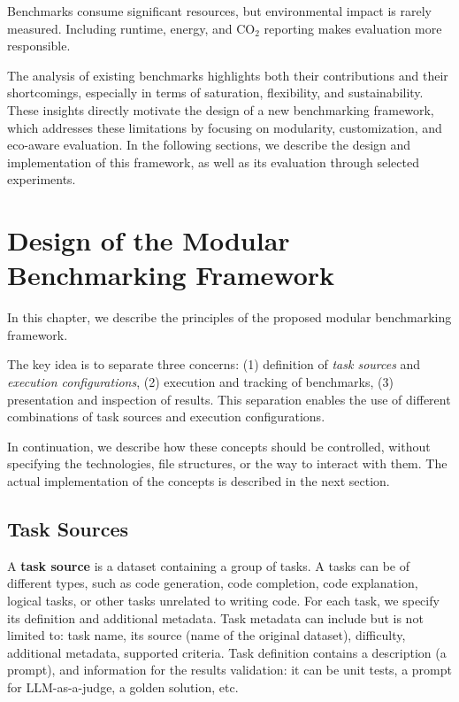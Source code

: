 Benchmarks consume significant resources, but environmental impact is rarely measured. Including runtime, energy, and CO$_2$ reporting makes evaluation more responsible.


The analysis of existing benchmarks highlights both their contributions and their shortcomings, especially in terms of saturation, flexibility, and sustainability.
These insights directly motivate the design of a new benchmarking framework, which addresses these limitations by focusing on modularity, customization, and eco-aware evaluation.
In the following sections, we describe the design and implementation of this framework, as well as its evaluation through selected experiments.


\section{Design of the Modular Benchmarking Framework}

In this chapter, we describe the principles of the proposed modular benchmarking framework.

The key idea is to separate three concerns:
(1) definition of \textit{task sources} and \textit{execution configurations},
(2) execution and tracking of benchmarks,
(3) presentation and inspection of results.
This separation enables the use of different combinations of task sources and execution configurations.

In continuation, we describe how these concepts should be controlled, without specifying the technologies, file structures, or the way to interact with them.
The actual implementation of the concepts is described in the next section.

\subsection{Task Sources}
A \textbf{task source} is a dataset containing a group of tasks.
A tasks can be of different types, such as code generation, code completion, code explanation, logical tasks, or other tasks unrelated to writing code.
For each task, we specify its definition and additional metadata.
Task metadata can include but is not limited to: task name, its source (name of the original dataset), difficulty, additional metadata, supported criteria.
Task definition contains a description (a prompt), and information for the results validation: it can be unit tests, a prompt for LLM-as-a-judge, a golden solution, etc.

